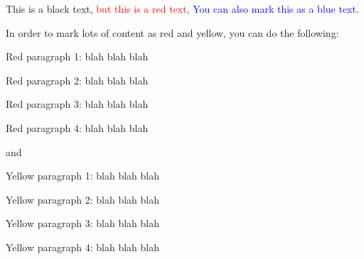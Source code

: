\documentclass{article}
\newcommand{\coloredsentence}[1][red]{\textcolor{#1}}
\newenvironment{coloredtext}[1][red]{
    \bgroup\color{#1}
}{
\egroup
}
\begin{document}
This is a black text, \coloredsentence{but this is a red text}, \coloredsentence[blue]{You can also mark this as a blue text}.

In order to mark lots of content as red and yellow, you can do the following:

\begin{coloredtext}
Red paragraph 1: blah blah blah

Red paragraph 2: blah blah blah

Red paragraph 3: blah blah blah

Red paragraph 4: blah blah blah

\end{coloredtext}

and

\begin{coloredtext}[yellow]
Yellow paragraph 1: blah blah blah

Yellow paragraph 2: blah blah blah

Yellow paragraph 3: blah blah blah

Yellow paragraph 4: blah blah blah
\end{coloredtext}
\end{document}
